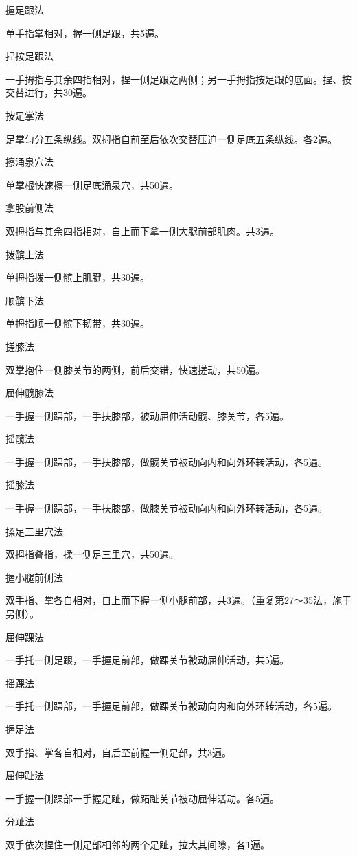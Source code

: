 \documentclass[12pt,UTF8]{ctexbook}
\begin{document}
握足跟法

单手指掌相对，握一侧足跟，共5遍。

捏按足跟法

一手拇指与其余四指相对，捏一侧足跟之两侧；另一手拇指按足跟的底面。捏、按交替进行，共30遍。

按足掌法

足掌匀分五条纵线。双拇指自前至后依次交替压迫一侧足底五条纵线。各2遍。

擦涌泉穴法

单掌根快速擦一侧足底涌泉穴，共50遍。

拿股前侧法

双拇指与其余四指相对，自上而下拿一侧大腿前部肌肉。共3遍。

拨髌上法

单拇指拨一侧髌上肌腱，共30遍。

顺髌下法

单拇指顺一侧髌下韧带，共30遍。

搓膝法

双掌抱住一侧膝关节的两侧，前后交错，快速搓动，共50遍。

屈伸髋膝法

一手握一侧踝部，一手扶膝部，被动屈伸活动髋、膝关节，各5遍。

摇髋法

一手握一侧踝部，一手扶膝部，做髋关节被动向内和向外环转活动，各5遍。

摇膝法

一手握一侧踝部，一手扶膝部，做膝关节被动向内和向外环转活动，各5遍。

揉足三里穴法

双拇指叠指，揉一侧足三里穴，共50遍。

握小腿前侧法

双手指、掌各自相对，自上而下握一侧小腿前部，共3遍。（重复第27～35法，施于另侧）。

屈伸踝法

一手托一侧足跟，一手握足前部，做踝关节被动屈伸活动，共5遍。

摇踝法

一手托一侧踝部，一手握足前部，做踝关节被动向内和向外环转活动，各5遍。

握足法

双手指、掌各自相对，自后至前握一侧足部，共3遍。

屈伸趾法

一手握一侧踝部一手握足趾，做跖趾关节被动屈伸活动。各5遍。

分趾法

双手依次捏住一侧足部相邻的两个足趾，拉大其间隙，各1遍。
\end{document}
